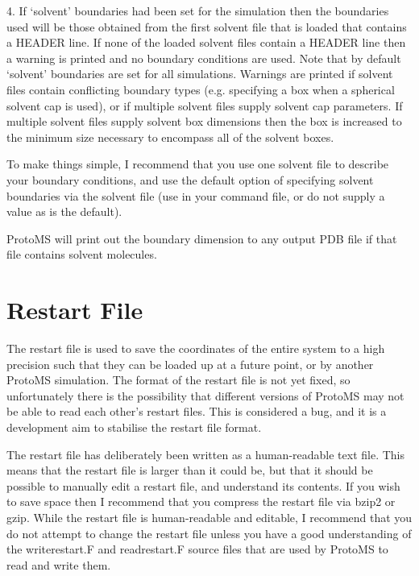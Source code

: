 \documentclass[letterpaper,10pt,english]{sphinxmanual}
\begin{document}
4. If ‘solvent’ boundaries had been set for the simulation then the boundaries used will be those obtained from the first solvent file that is loaded that contains a HEADER line. If none of the loaded solvent files contain a HEADER line then a warning is printed and no boundary conditions are used. Note that by default ‘solvent’ boundaries are set for all simulations.
Warnings are printed if solvent files contain conflicting boundary types (e.g. specifying a box when a spherical solvent cap is used), or if multiple solvent files supply solvent cap parameters. If multiple solvent files supply solvent box dimensions then the box is increased to the minimum size necessary to encompass all of the solvent boxes.

To make things simple, I recommend that you use one solvent file to describe your boundary conditions, and use the default option of specifying solvent boundaries via the solvent file (use  in your command file, or do not supply a  value as  is the default).

ProtoMS will print out the boundary dimension to any output PDB file if that file contains solvent molecules.


\section{Restart File}
\label{\detokenize{protoms:restart-file}}
The restart file is used to save the coordinates of the entire system to a high precision such that they can be loaded up at a future point, or by another ProtoMS simulation. The format of the restart file is not yet fixed, so unfortunately there is the possibility that different versions of ProtoMS may not be able to read each other’s restart files. This is considered a bug, and it is a development aim to stabilise the restart file format.

The restart file has deliberately been written as a human-readable text file. This means that the restart file is larger than it could be, but that it should be possible to manually edit a restart file, and understand its contents. If you wish to save space then I recommend that you compress the restart file via bzip2 or gzip. While the
restart file is human-readable and editable, I recommend that you do not attempt to change the restart file unless you have a good understanding of the writerestart.F and readrestart.F source files that are used by ProtoMS to read and write them.
\end{document}
